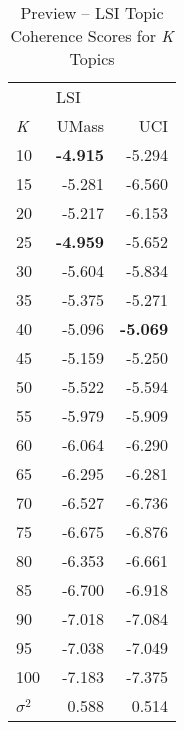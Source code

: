 \documentclass[letterpaper,12pt]{article}
\begin{document}
\begin{table}
	\caption{\label{tab:lsi_preview_tc} Preview -- LSI Topic Coherence Scores for \emph{K} Topics}
	\begin{center}
		\begin{tabular}{lrr}
			\toprule
			{} & \multicolumn{2}{l}{LSI} \\
			\emph{K} &  UMass &    UCI \\
			\midrule
			10  & \textbf{-4.915} & -5.294 \\
			15  & -5.281 & -6.560 \\
			20  & -5.217 & -6.153 \\
			25  & \textbf{-4.959} & -5.652 \\
			30  & -5.604 & -5.834 \\
			35  & -5.375 & -5.271 \\
			40  & -5.096 & \textbf{-5.069} \\
			45  & -5.159 & -5.250 \\
			50  & -5.522 & -5.594 \\
			55  & -5.979 & -5.909 \\
			60  & -6.064 & -6.290 \\
			65  & -6.295 & -6.281 \\
			70  & -6.527 & -6.736 \\
			75  & -6.675 & -6.876 \\
			80  & -6.353 & -6.661 \\
			85  & -6.700 & -6.918 \\
			90  & -7.018 & -7.084 \\
			95  & -7.038 & -7.049 \\
			100 & -7.183 & -7.375 \\
			\midrule
			$\sigma^2$ & 0.588 & 0.514 \\
			\bottomrule
			\end{tabular}
	\end{center}
\end{table}


\end{document}
